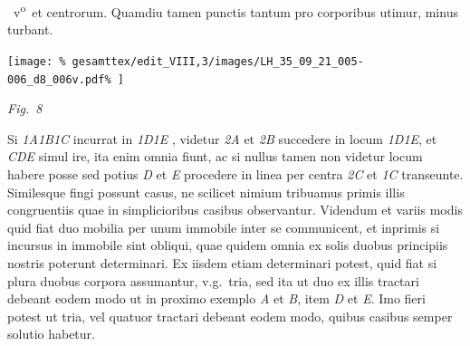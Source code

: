 %
~v\textsuperscript{o}\rbrack\ et centrorum.%
\protect{} Quamdiu tamen punctis  
tantum pro corporibus utimur, minus turbant. 
%
\pend
%
\vspace{2.0em} %
\centerline{%
\texttt{[image: \%
gesamttex/edit\_VIII,3/images/LH\_35\_09\_21\_005-006\_d8\_006v.pdf\%
]}} 
\vspace{0.5em}
\centerline{%
\lbrack\textit{Fig.~8}\rbrack%
}
\vspace{1.5em}
%
\pstart
Si \textit{{\scriptsize1}A{\scriptsize1}B{\scriptsize 1}C} incurrat in \textit{{\scriptsize 1}D{\scriptsize 1}E} , videtur \textit{{\scriptsize2}A} et \textit{{\scriptsize2}B} succedere in locum
\textit{{\scriptsize 1}D{\scriptsize 1}E}, et \textit{CDE} simul ire, ita enim omnia fiunt, ac si nullus 
%
%
tamen non videtur locum habere posse sed potius \textit{D} et \textit{E} procedere in linea per centra \textit{{\scriptsize 2}C} et \textit{{\scriptsize 1}C} transeunte.%
\protect{} Similesque fingi possunt casus, ne scilicet nimium tribuamus primis illis congruentiis%
\protect{} quae in simplicioribus casibus%
\protect{} observantur. \pend
%
\pstart 
Videndum et variis modis quid fiat  duo mobilia%
\protect{} per unum immobile%
\protect{} inter se communicent, et inprimis si incursus in immobile sint obliqui\protect{}, quae quidem omnia ex solis duobus principiis nostris poterunt determinari. Ex iisdem etiam determinari potest, quid fiat si plura duobus corpora assumantur, v.g.\ tria, sed ita ut duo ex illis tractari debeant eodem modo ut in proximo exemplo \textit{A} et \textit{B}, item \textit{D} et \textit{E}. Imo fieri potest ut tria, vel quatuor tractari debeant eodem modo, quibus casibus semper solutio habetur. 
\pend
\count{}%
\count{}%
\count{}